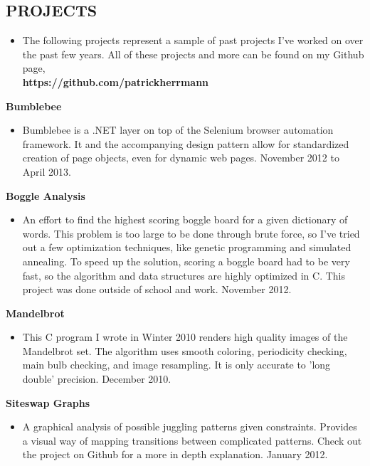 \documentclass{res}
\begin{document}
\begin{resume}
\section{PROJECTS} 
\vspace{0.2in}
   \begin{itemize} %
      \item[] The following projects represent a sample of past projects I've worked
      on over the past few years. All of these projects and more can be found on my
       Github page, \\
      {\bf https://github.com/patrickherrmann}
      \end{itemize}
  {\bf Bumblebee}
    \begin{itemize} %
      \item[] Bumblebee is a .NET layer on top of the Selenium browser automation framework. 
      It and the accompanying design pattern allow for standardized creation of page objects, 
      even for dynamic web pages. November 2012 to April 2013.

      \end{itemize}
{\bf Boggle Analysis} 
       \begin{itemize}
        \item[] An effort to find the highest scoring boggle board for a given dictionary of words. This problem is too large to be done through brute force, so I've tried out a few optimization techniques, like genetic programming and simulated annealing. To speed up the solution, scoring a boggle board had to be very fast, so the algorithm and data structures are highly optimized in C. This project was done outside of school and work. November 2012.

    \end{itemize}

  {\bf Mandelbrot} 
        \begin{itemize}
        \item[] This C program I wrote in Winter 2010 renders high quality images of the Mandelbrot set. The algorithm uses smooth coloring, periodicity checking, main bulb checking, and image resampling. It is only accurate to 'long double' precision. December 2010.

       \end{itemize}

   {\bf  Siteswap Graphs} 
        \begin{itemize}
        \item[]  A graphical analysis of possible juggling patterns given constraints. Provides a visual way of mapping transitions between complicated patterns. Check out the project on Github for a more in depth explanation. January 2012.


\end{itemize}
\end{resume}
\end{document}
